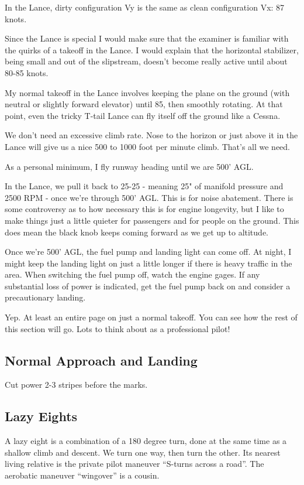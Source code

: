 In the Lance, dirty configuration Vy is the same as clean configuration Vx: 87 knots.

Since the Lance is special I would make sure that the examiner is familiar with the quirks of a takeoff in the Lance. I would explain that the horizontal stabilizer, being small and out of the slipstream, doesn't become really active until about 80-85 knots.

My normal takeoff in the Lance involves keeping the plane on the ground (with neutral or slightly forward elevator) until 85, then smoothly rotating. At that point, even the tricky T-tail Lance can fly itself off the ground like a Cessna.

We don't need an excessive climb rate. Nose to the horizon or just above it in the Lance will give us a nice 500 to 1000 foot per minute climb. That's all we need.

As a personal minimum, I fly runway heading until we are 500' AGL.

In the Lance, we pull it back to 25-25 - meaning 25" of manifold pressure and 2500 RPM - once we're through 500' AGL. This is for noise abatement. There is some controversy as to how necessary this is for engine longevity, but I like to make things just a little quieter for passengers and for people on the ground. This does mean the black knob keeps coming forward as we get up to altitude.

Once we're 500' AGL, the fuel pump and landing light can come off. At night, I might keep the landing light on just a little longer if there is heavy traffic in the area. When switching the fuel pump off, watch the engine gages. If any substantial loss of power is indicated, get the fuel pump back on and consider a precautionary landing.

Yep. At least an entire page on just a normal takeoff. You can see how the rest of this section will go. Lots to think about as a professional pilot!

\subsection{Normal Approach and Landing}

Cut power 2-3 stripes before the marks.

\subsection{Lazy Eights}

A lazy eight is a combination of a 180 degree turn, done at the same time as a shallow climb and descent. We turn one way, then turn the other. Its nearest living relative is the private pilot maneuver ``S-turns across a road''. The aerobatic maneuver ``wingover'' is a cousin.

